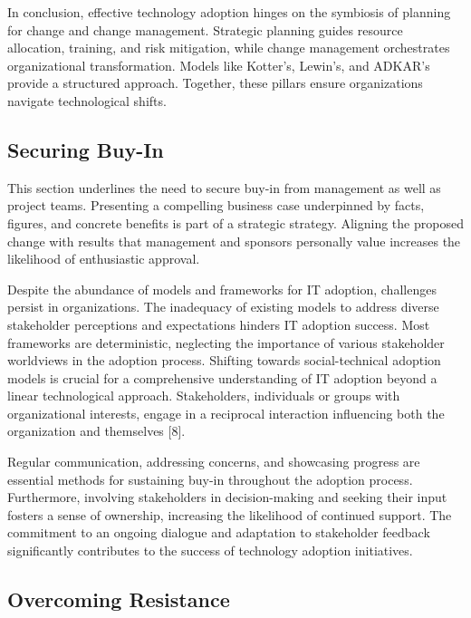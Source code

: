 \documentclass{article}
\begin{document}
\noindent In conclusion, effective technology adoption hinges on the symbiosis of planning for change and change management. Strategic planning guides resource allocation, training, and risk mitigation, while change management orchestrates organizational transformation. Models like Kotter's, Lewin's, and ADKAR's provide a structured approach. Together, these pillars ensure organizations navigate technological shifts.

\subsection{Securing Buy-In}
This section underlines the need to secure buy-in from management as well as project teams. Presenting a compelling business case underpinned by facts, figures, and concrete benefits is part of a strategic strategy. Aligning the proposed change with results that management and sponsors personally value increases the likelihood of enthusiastic approval. \newline

\noindent Despite the abundance of models and frameworks for IT adoption, challenges persist in organizations. The inadequacy of existing models to address diverse stakeholder perceptions and expectations hinders IT adoption success. Most frameworks are deterministic, neglecting the importance of various stakeholder worldviews in the adoption process. Shifting towards social-technical adoption models is crucial for a comprehensive understanding of IT adoption beyond a linear technological approach. Stakeholders, individuals or groups with organizational interests, engage in a reciprocal interaction influencing both the organization and themselves [8]. \newline

\noindent Regular communication, addressing concerns, and showcasing progress are essential methods for sustaining buy-in throughout the adoption process. Furthermore, involving stakeholders in decision-making and seeking their input fosters a sense of ownership, increasing the likelihood of continued support. The commitment to an ongoing dialogue and adaptation to stakeholder feedback significantly contributes to the success of technology adoption initiatives.



\subsection{Overcoming Resistance}
\lipsum[19]
\end{document}
